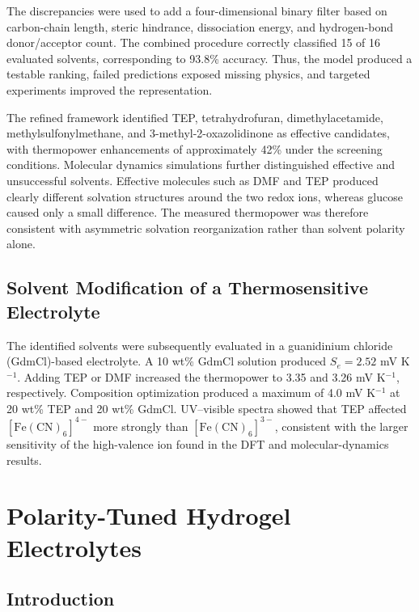 \documentclass[a4paper,12pt]{report}
\begin{document}
The discrepancies were used to add a four-dimensional binary filter based on
carbon-chain length, steric hindrance, dissociation energy, and hydrogen-bond
donor/acceptor count. The combined procedure correctly classified 15 of 16
evaluated solvents, corresponding to 93.8\% accuracy. Thus, the model produced
a testable ranking, failed predictions exposed missing physics, and targeted
experiments improved the representation.

The refined framework identified TEP, tetrahydrofuran, dimethylacetamide,
methylsulfonylmethane, and 3-methyl-2-oxazolidinone as effective candidates,
with thermopower enhancements of approximately 42\% under the screening
conditions. Molecular dynamics simulations further distinguished effective
and unsuccessful solvents. Effective molecules such as DMF and TEP produced
clearly different solvation structures around the two redox ions, whereas
glucose caused only a small difference. The measured thermopower was therefore
consistent with asymmetric solvation reorganization rather than solvent
polarity alone.

\section{Solvent Modification of a Thermosensitive Electrolyte}

The identified solvents were subsequently evaluated in a guanidinium chloride
(GdmCl)-based electrolyte. A 10 wt\% GdmCl solution produced
$S_e=2.52$ mV K$^{-1}$. Adding TEP or DMF increased the thermopower to
3.35 and 3.26 mV K$^{-1}$, respectively. Composition optimization produced a
maximum of 4.0 mV K$^{-1}$ at 20 wt\% TEP and 20 wt\% GdmCl.
UV--visible spectra showed that TEP affected
$[\mathrm{Fe(CN)}_6]^{4-}$ more strongly than
$[\mathrm{Fe(CN)}_6]^{3-}$, consistent with the larger sensitivity of the
high-valence ion found in the DFT and molecular-dynamics results.

\chapter{Polarity-Tuned Hydrogel Electrolytes}

\section{Introduction}
\end{document}
